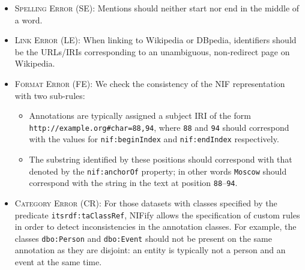 \documentclass[sigconf]{acmart}
\begin{document}
\begin{itemize} 
\item \textsc{Spelling Error} (SE): Mentions should neither start nor end in the middle of a word.
\item \textsc{Link Error} (LE): When linking to Wikipedia or DBpedia, identifiers should be the URLs/IRIs corresponding to an unambiguous, non-redirect page on Wikipedia.
\item \textsc{Format Error} (FE): We check the consistency of the NIF representation with two sub-rules:
\begin{itemize}
\item Annotations are typically assigned a subject IRI of the form \texttt{http://example.org\#char=88,94}, where \texttt{88} and \texttt{94} should correspond with the values for \texttt{nif:beginIndex} and \texttt{nif:endIndex} respectively.
\item The substring identified by these positions should correspond with that denoted by the \texttt{nif:anchorOf} property; in other words \texttt{Moscow} should correspond with the string in the text at position \texttt{88}--\texttt{94}.
\end{itemize}
\item \textsc{Category Error} (CR): For those datasets with classes specified by the predicate \texttt{itsrdf:taClassRef}, NIFify allows the specification of custom rules in order to detect inconsistencies in the annotation classes. For example, the classes \texttt{dbo:Person} and \texttt{dbo:Event} should not be present on the same annotation as they are disjoint: an entity is typically not a person and an event at the same time.
\end{itemize}

%
%
%
%
%
%
\end{document}
